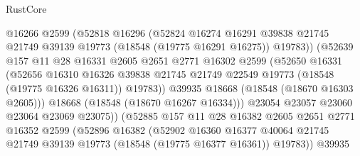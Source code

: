 \begin{lexlean}{RustCore}
\begin{coremodule}
                            @16266
                            @2599
                            (@52818
                              @16296
                              (@52824
                                @16274
                                @16291
                                @39838
                                @21745
                                @21749
                                @39139
                                @19773
                                (@18548 (@19775 @16291 @16275))
                                @19783))
                            (@52639
                              @157
                              @11
                              @28
                              @16331
                              @2605
                              @2651
                              @2771
                              @16302
                              @2599
                              (@52650
                                @16331
                                (@52656
                                  @16310
                                  @16326
                                  @39838
                                  @21745
                                  @21749
                                  @22549
                                  @19773
                                  (@18548 (@19775 @16326 @16311))
                                  @19783))
                              @39935
                              @18668
                              (@18548 (@18670 @16303 @2605)))
                            @18668
                            (@18548 (@18670 @16267 @16334)))
                          @23054
                          @23057
                          @23060
                          @23064
                          @23069
                          @23075))
                      (@52885
                        @157
                        @11
                        @28
                        @16382
                        @2605
                        @2651
                        @2771
                        @16352
                        @2599
                        (@52896
                          @16382
                          (@52902
                            @16360
                            @16377
                            @40064
                            @21745
                            @21749
                            @39139
                            @19773
                            (@18548 (@19775 @16377 @16361))
                            @19783))
                        @39935

\end{coremodule}
\end{lexlean}
